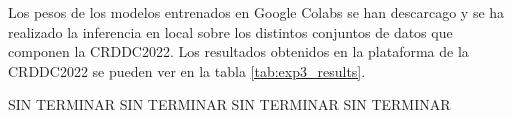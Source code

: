 Los pesos de los modelos entrenados en Google Colabs se han descarcago y se ha realizado la inferencia en local sobre los distintos conjuntos de datos que componen la CRDDC2022. Los resultados obtenidos en la plataforma de la CRDDC2022 se pueden ver en la tabla \ref{tab:exp3_results}.

\begin{table}[H]
    \centering
    \caption{F1-scores obtenidos en la plataforma de la CRDDC2022 para los distintos conjuntos de datos.}
    \label{tab:exp3_results}
\end{table}

SIN TERMINAR
SIN TERMINAR
SIN TERMINAR
SIN TERMINAR